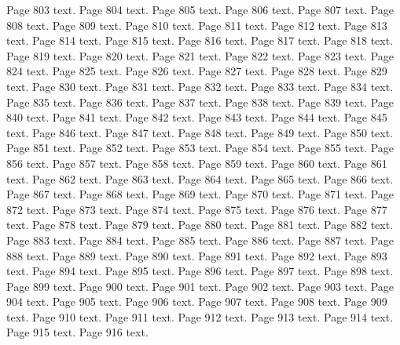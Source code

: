\documentclass{article}
\begin{document}
Page 803 text.\newpage
Page 804 text.\newpage
Page 805 text.\newpage
Page 806 text.\newpage
Page 807 text.\newpage
Page 808 text.\newpage
Page 809 text.\newpage
Page 810 text.\newpage
Page 811 text.\newpage
Page 812 text.\newpage
Page 813 text.\newpage
Page 814 text.\newpage
Page 815 text.\newpage
Page 816 text.\newpage
Page 817 text.\newpage
Page 818 text.\newpage
Page 819 text.\newpage
Page 820 text.\newpage
Page 821 text.\newpage
Page 822 text.\newpage
Page 823 text.\newpage
Page 824 text.\newpage
Page 825 text.\newpage
Page 826 text.\newpage
Page 827 text.\newpage
Page 828 text.\newpage
Page 829 text.\newpage
Page 830 text.\newpage
Page 831 text.\newpage
Page 832 text.\newpage
Page 833 text.\newpage
Page 834 text.\newpage
Page 835 text.\newpage
Page 836 text.\newpage
Page 837 text.\newpage
Page 838 text.\newpage
Page 839 text.\newpage
Page 840 text.\newpage
Page 841 text.\newpage
Page 842 text.\newpage
Page 843 text.\newpage
Page 844 text.\newpage
Page 845 text.\newpage
Page 846 text.\newpage
Page 847 text.\newpage
Page 848 text.\newpage
Page 849 text.\newpage
Page 850 text.\newpage
Page 851 text.\newpage
Page 852 text.\newpage
Page 853 text.\newpage
Page 854 text.\newpage
Page 855 text.\newpage
Page 856 text.\newpage
Page 857 text.\newpage
Page 858 text.\newpage
Page 859 text.\newpage
Page 860 text.\newpage
Page 861 text.\newpage
Page 862 text.\newpage
Page 863 text.\newpage
Page 864 text.\newpage
Page 865 text.\newpage
Page 866 text.\newpage
Page 867 text.\newpage
Page 868 text.\newpage
Page 869 text.\newpage
Page 870 text.\newpage
Page 871 text.\newpage
Page 872 text.\newpage
Page 873 text.\newpage
Page 874 text.\newpage
Page 875 text.\newpage
Page 876 text.\newpage
Page 877 text.\newpage
Page 878 text.\newpage
Page 879 text.\newpage
Page 880 text.\newpage
Page 881 text.\newpage
Page 882 text.\newpage
Page 883 text.\newpage
Page 884 text.\newpage
Page 885 text.\newpage
Page 886 text.\newpage
Page 887 text.\newpage
Page 888 text.\newpage
Page 889 text.\newpage
Page 890 text.\newpage
Page 891 text.\newpage
Page 892 text.\newpage
Page 893 text.\newpage
Page 894 text.\newpage
Page 895 text.\newpage
Page 896 text.\newpage
Page 897 text.\newpage
Page 898 text.\newpage
Page 899 text.\newpage
Page 900 text.\newpage
Page 901 text.\newpage
Page 902 text.\newpage
Page 903 text.\newpage
Page 904 text.\newpage
Page 905 text.\newpage
Page 906 text.\newpage
Page 907 text.\newpage
Page 908 text.\newpage
Page 909 text.\newpage
Page 910 text.\newpage
Page 911 text.\newpage
Page 912 text.\newpage
Page 913 text.\newpage
Page 914 text.\newpage
Page 915 text.\newpage
Page 916 text.\newpage
\end{document}
